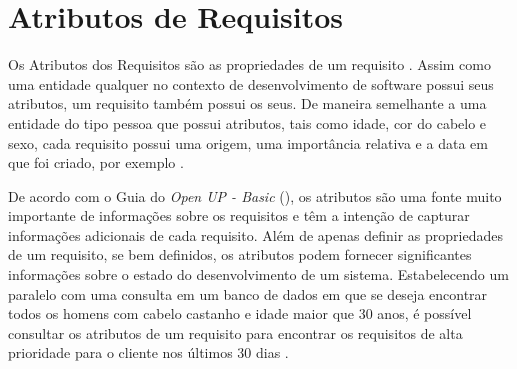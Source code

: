 \section[Atributos de Requisitos]{Atributos de Requisitos}

Os Atributos dos Requisitos são as propriedades de um requisito \cite{openUp}. Assim como uma entidade qualquer no contexto de desenvolvimento de software possui seus atributos, um requisito também possui os seus. De maneira semelhante a uma entidade do tipo pessoa que possui atributos, tais como idade, cor do cabelo e sexo, cada requisito possui uma origem, uma importância relativa e a data em que foi criado, por exemplo \cite{openUpBasic}.

De acordo com o Guia do \textit{Open UP - Basic} (\citeyear{openUpBasic}), os atributos são uma fonte muito importante de informações sobre os requisitos e têm a intenção de capturar informações adicionais de cada requisito. Além de apenas definir as propriedades de um requisito, se bem definidos, os atributos podem fornecer significantes informações sobre o estado do desenvolvimento de um sistema. Estabelecendo um paralelo com uma consulta em um banco de dados em que se deseja encontrar todos os homens com cabelo castanho e idade maior que 30 anos, é possível consultar os atributos de um requisito para encontrar os requisitos de alta prioridade para o cliente nos últimos 30 dias \cite{openUpBasic}.

